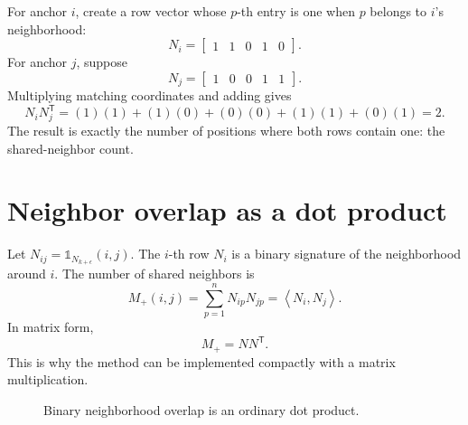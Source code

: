 \documentclass[11pt,oneside,openany]{book}
\theoremstyle{myplain}
\theoremstyle{definition}
\newcommand{\ind}{\mathds{1}}
\newcommand{\inner}[2]{\left\langle #1,#2\right\rangle}
\newcommand{\transpose}{\mathsf{T}}
\newcommand{\paperEq}[1]{\tag{P#1}}
\begin{document}
For anchor $i$, create a row vector whose $p$-th entry is one when $p$ belongs to $i$'s neighborhood:
\[
  N_i=\begin{bmatrix}1&1&0&1&0\end{bmatrix}.
\]
For anchor $j$, suppose
\[
  N_j=\begin{bmatrix}1&0&0&1&1\end{bmatrix}.
\]
Multiplying matching coordinates and adding gives
\[
  N_iN_j^{\mathsf T}
  =(1)(1)+(1)(0)+(0)(0)+(1)(1)+(0)(1)=2.
\]
The result is exactly the number of positions where both rows contain one: the shared-neighbor count.



\section{Neighbor overlap as a dot product}

Let $N_{ij}=\ind_{N_{k+\epsilon}}(i,j)$. The $i$-th row $N_i$ is a binary signature of the neighborhood around $i$. The number of shared neighbors is
\begin{equation}
  M_+(i,j)=\sum_{p=1}^{n}N_{ip}N_{jp}
  =\inner{N_i}{N_j}.
  \label{eq:mplus}
\end{equation}
In matrix form,
\begin{equation*}
  M_+=NN^\transpose.
\paperEq{22}
\label{eq:mplus-matrix}
\end{equation*}
This is why the method can be implemented compactly with a matrix multiplication.

\begin{figure}[H]
\centering
{}
\caption{Binary neighborhood overlap is an ordinary dot product.}
\label{fig:binary-dot}
\end{figure}
\end{document}

